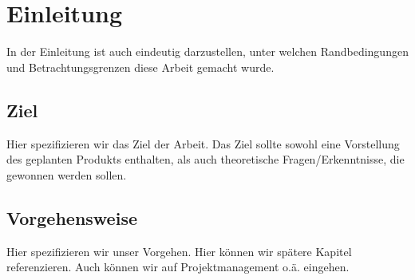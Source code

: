 \chapter{Einleitung} \label{einleitung}

\nocite{*}

In der Einleitung ist auch eindeutig darzustellen, unter welchen Randbedingungen und Betrachtungsgrenzen diese Arbeit gemacht wurde.


\section{Ziel} \label{einleitung-ziel}

Hier spezifizieren wir das Ziel der Arbeit. Das Ziel sollte sowohl eine Vorstellung des geplanten Produkts enthalten, als auch theoretische Fragen/Erkenntnisse, die gewonnen werden sollen.


\section{Vorgehensweise} \label{einleitung-vorgehen}

Hier spezifizieren wir unser Vorgehen. Hier können wir spätere Kapitel referenzieren. Auch können wir auf Projektmanagement o.ä. eingehen.

